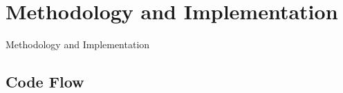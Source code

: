 \chapter{Methodology and Implementation}\label{chap:meth_and_impl}

Methodology and Implementation



\section{Code Flow}